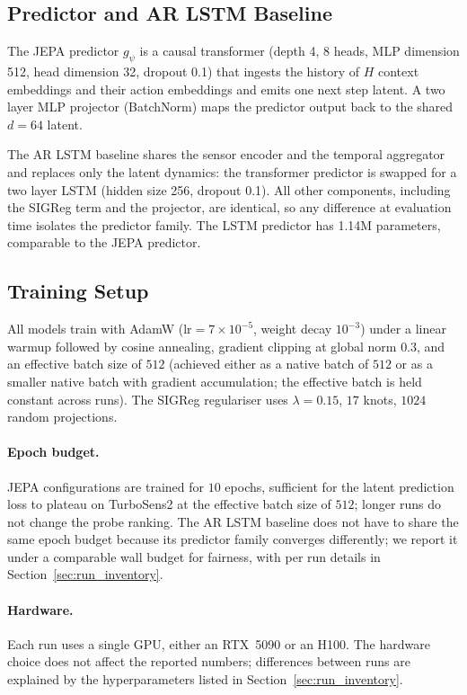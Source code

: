 \subsection{Predictor and AR LSTM Baseline}
\label{app:predictor}

The JEPA predictor $g_\psi$ is a causal transformer (depth 4, 8 heads,
MLP dimension 512, head dimension 32, dropout 0.1) that ingests the
history of $H$ context embeddings and their action embeddings and emits
one next step latent. A two layer MLP projector (BatchNorm) maps the
predictor output back to the shared $d{=}64$ latent.

The AR LSTM baseline shares the sensor encoder and the temporal
aggregator and replaces only the latent dynamics: the transformer
predictor is swapped for a two layer LSTM (hidden size 256, dropout
0.1). All other components, including the SIGReg term and the
projector, are identical, so any difference at evaluation time isolates
the predictor family. The LSTM predictor has 1.14M parameters,
comparable to the JEPA predictor.

\subsection{Training Setup}
\label{app:training}

All models train with AdamW ($\text{lr}{=}7\!\times\!10^{-5}$, weight
decay $10^{-3}$) under a linear warmup followed by cosine annealing,
gradient clipping at global norm $0.3$, and an effective batch size of
$512$ (achieved either as a native batch of $512$ or as a smaller
native batch with gradient accumulation; the effective batch is held
constant across runs). The SIGReg regulariser uses
$\lambda{=}0.15$, $17$ knots, $1024$ random projections.

\paragraph{Epoch budget.}
JEPA configurations are trained for $10$ epochs, sufficient for the
latent prediction loss to plateau on TurboSens2 at the effective batch
size of $512$; longer runs do not change the probe ranking. The AR LSTM
baseline does not have to share the same epoch budget because its
predictor family converges differently; we report it under a comparable
wall budget for fairness, with per run details in
Section~\ref{sec:run_inventory}.

\paragraph{Hardware.}
Each run uses a single GPU, either an RTX~5090 or an H100. The hardware
choice does not affect the reported numbers; differences between runs
are explained by the hyperparameters listed in
Section~\ref{sec:run_inventory}.

